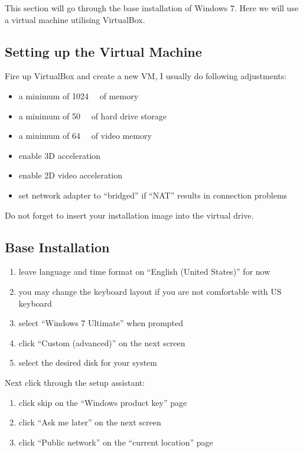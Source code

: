 \documentclass{itsarticle}
\begin{document}
This section will go through the base installation of Windows 7. Here we will
use a virtual machine utilising VirtualBox\footnotemark.


\subsection{Setting up the Virtual Machine}
\label{sub:virtual_box}

Fire up VirtualBox and create a new VM, I usually do following adjustments:

\begin{itemize}
    \item a minimum of \SI{1024}{\mega\byte} of memory
    \item a minimum of \SI{50}{\giga\byte} of hard drive storage
    \item a minimum of \SI{64}{\mega\byte} of video memory
    \item enable 3D acceleration
    \item enable 2D video acceleration
    \item set network adapter to ``bridged'' if ``NAT'' results in connection
        problems
\end{itemize}

Do not forget to insert your installation image into the virtual drive.

\subsection{Base Installation}
\label{sub:base_install}

\begin{enumerate}
    \item leave language and time format on ``English (United States)'' for now
    \item you may change the keyboard layout if you are not comfortable with US
        keyboard
    \item select ``Windows 7 Ultimate'' when prompted
    \item click ``Custom (advanced)'' on the next screen
    \item select the desired disk for your system
\end{enumerate}

Next click through the setup assistant:

\begin{enumerate}
    \item click skip on the ``Windows product key'' page
    \item click ``Ask me later'' on the next screen
    \item click ``Public network'' on the ``current location'' page
\end{enumerate}
\end{document}
